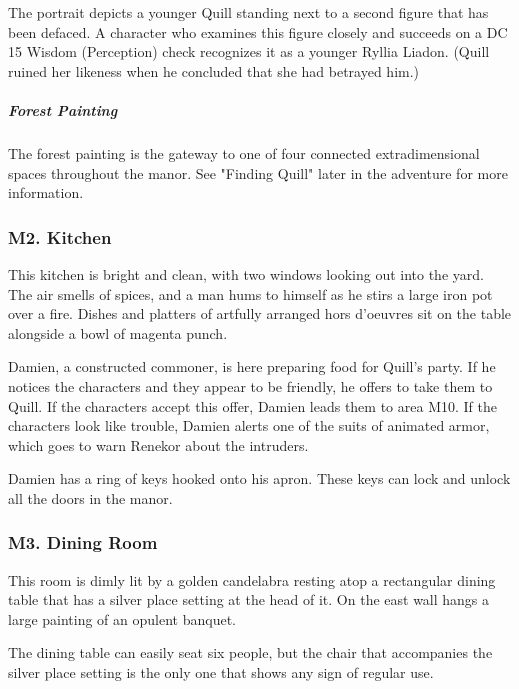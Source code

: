 \documentclass[10pt,a4paper,twoside,bg=print,twocolumn,openany,nodeprecatedcode]{dndbook}
\begin{document}
The portrait depicts a younger Quill standing next to a second figure that has been defaced. A character who examines this figure closely and succeeds on a DC 15 Wisdom (Perception) check recognizes it as a younger Ryllia Liadon. (Quill ruined her likeness when he concluded that she had betrayed him.)

\subparagraph{Forest Painting}
The forest painting is the gateway to one of four connected extradimensional spaces throughout the manor. See "Finding Quill" later in the adventure for more information.

\subsubsection{M2. Kitchen}
\begin{DndReadAloud}{}
This kitchen is bright and clean, with two windows looking out into the yard. The air smells of spices, and a man hums to himself as he stirs a large iron pot over a fire. Dishes and platters of artfully arranged hors d'oeuvres sit on the table alongside a bowl of magenta punch.

\end{DndReadAloud}

Damien, a constructed commoner, is here preparing food for Quill's party. If he notices the characters and they appear to be friendly, he offers to take them to Quill. If the characters accept this offer, Damien leads them to area M10. If the characters look like trouble, Damien alerts one of the suits of animated armor, which goes to warn Renekor about the intruders.

Damien has a ring of keys hooked onto his apron. These keys can lock and unlock all the doors in the manor.

\subsubsection{M3. Dining Room}
\begin{DndReadAloud}{}
This room is dimly lit by a golden candelabra resting atop a rectangular dining table that has a silver place setting at the head of it. On the east wall hangs a large painting of an opulent banquet.

\end{DndReadAloud}

The dining table can easily seat six people, but the chair that accompanies the silver place setting is the only one that shows any sign of regular use.
\end{document}
